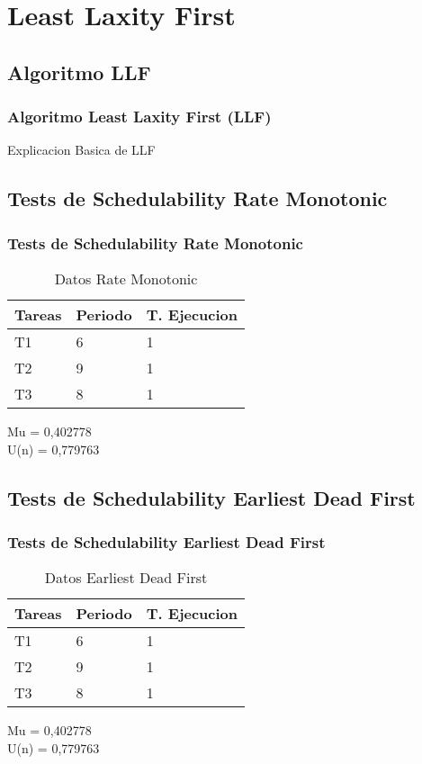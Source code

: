 \documentclass[xcolor=table]{beamer}
\begin{document}

\section{Least Laxity First}

\subsection{Algoritmo LLF}

\begin{frame} 
\frametitle{Algoritmo Least Laxity First (LLF)} 
Explicacion Basica de LLF \\
\end{frame}

\subsection{Tests de Schedulability  Rate Monotonic } 

\begin{frame} 
\frametitle{Tests de Schedulability  Rate Monotonic } 
\begin{table} 
\centering 
\begin{tabular}{|l|l|l|} 
\hline 
Tareas & Periodo & T. Ejecucion \\ \hline 
T1   & 6  &  1\\ \hline 
T2   & 9  &  1\\ \hline 
T3   & 8  &  1\\ \hline 
\end{tabular} 
\caption{Datos  Rate Monotonic } 
\end{table} 
Mu =  0,402778 \\ 
U(n) =  0,779763 \\ 
\end{frame} 

\subsection{Tests de Schedulability  Earliest Dead First } 

\begin{frame} 
\frametitle{Tests de Schedulability  Earliest Dead First } 
\begin{table} 
\centering 
\begin{tabular}{|l|l|l|} 
\hline 
Tareas & Periodo & T. Ejecucion \\ \hline 
T1   & 6  &  1\\ \hline 
T2   & 9  &  1\\ \hline 
T3   & 8  &  1\\ \hline 
\end{tabular} 
\caption{Datos  Earliest Dead First } 
\end{table} 
Mu =  0,402778 \\ 
U(n) =  0,779763 \\ 
\end{frame} 
\end{document}
